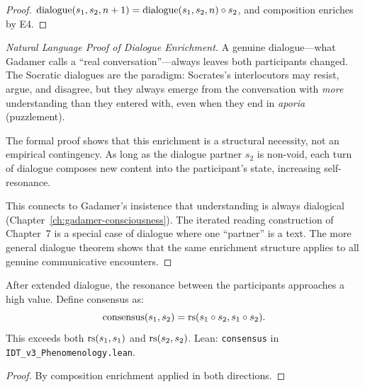 \begin{proof}
$\mathrm{dialogue}(s_1, s_2, n+1) = \mathrm{dialogue}(s_1, s_2, n) \circ s_2$,
and composition enriches by E4.
\end{proof}

\begin{proof}[Natural Language Proof of Dialogue Enrichment]
A genuine dialogue---what Gadamer calls a ``real conversation''---always
leaves both participants changed.  The Socratic dialogues are the paradigm:
Socrates's interlocutors may resist, argue, and disagree, but they always
emerge from the conversation with \emph{more} understanding than they entered
with, even when they end in \textit{aporia} (puzzlement).

The formal proof shows that this enrichment is a structural necessity, not
an empirical contingency.  As long as the dialogue partner $s_2$ is non-void,
each turn of dialogue composes new content into the participant's state,
increasing self-resonance.

This connects to Gadamer's insistence that understanding is always dialogical
(Chapter~\ref{ch:gadamer-consciousness}).  The iterated reading construction
of Chapter~7 is a special case of dialogue where one ``partner'' is a text.
The more general dialogue theorem shows that the same enrichment structure
applies to all genuine communicative encounters.
\end{proof}

\begin{theorem}
\label{thm:consensus}
After extended dialogue, the resonance between the participants approaches
a high value.  Define consensus as:
\[
\mathrm{consensus}(s_1, s_2) = \mathrm{rs}(s_1 \circ s_2, s_1 \circ s_2).
\]
This exceeds both $\mathrm{rs}(s_1, s_1)$ and $\mathrm{rs}(s_2, s_2)$.
Lean: \texttt{consensus} in \texttt{IDT\_v3\_Phenomenology.lean}.
\end{theorem}

\begin{proof}
By composition enrichment applied in both directions.
\end{proof}

